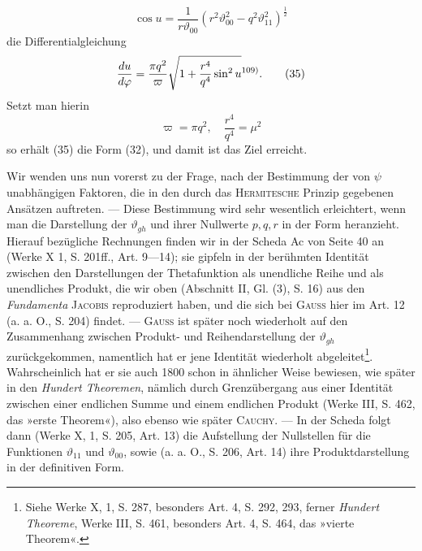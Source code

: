 \[
\cos u=\frac1{r\vartheta_{00}}(r^2\vartheta_{00}^2-q^2\vartheta_{11}^2)^{\frac12}
\]
\noindent die Differentialgleichung
\begingroup\makeatletter\tagsleft@true\let\veqno\leqno\makeatother
\begin{equation*}
\frac{du}{d\varphi}=\frac{\pi q^2}{\varpi}\sqrt{1+\frac{r^4}{q^4}\sin^2u}\text{\textsuperscript{109)}}.\tag{35}
\end{equation*}
\endgroup
\setcounter{footnote}{109}
\clearpage{}
\noindent Setzt man hierin
\begingroup\makeatletter\tagsleft@true\let\veqno\leqno\makeatother
\begin{equation*}
\varpi=\pi q^2,\quad\frac{r^4}{q^4}=\mu^2\tag{36}
\end{equation*}
\endgroup
\noindent so erhält (35) die Form (32), und damit ist das Ziel erreicht.

Wir wenden uns nun vorerst zu der Frage, nach der Bestimmung der von
\(\psi\) unabhängigen Faktoren, die in den durch das \textsc{Hermitesche} Prinzip gegebenen
Ansätzen auftreten. — Diese Bestimmung wird sehr wesentlich erleichtert,
wenn man die Darstellung der \(\vartheta_{gh}\) und ihrer Nullwerte \(p,q,r\) in der Form
 heranzieht. Hierauf bezügliche Rechnungen finden
wir in der Scheda Ac von Seite 40 an (Werke X 1, S. 201ff., Art. 9—14);
sie gipfeln in der berühmten Identität zwischen den Darstellungen der Thetafunktion als unendliche Reihe und als unendliches Produkt, die wir oben
(Abschnitt II, Gl. (3), S. 16) aus den \textit{Fundamenta} \textsc{Jacobis} reproduziert haben,
und die sich bei \textsc{Gauss} hier im Art. 12 (a. a. O., S. 204) findet. — \textsc{Gauss} ist
später noch wiederholt auf den Zusammenhang zwischen Produkt- und Reihendarstellung der \(\vartheta_{gh}\) zurückgekommen, namentlich hat er jene Identität wiederholt abgeleitet\footnote{Siehe Werke X, 1, S. 287, besonders Art. 4, S. 292, 293, ferner \textit{Hundert Theoreme}, Werke III, S. 461, besonders Art. 4, S. 464, das »vierte Theorem«.}. Wahrscheinlich hat er sie auch 1800 schon in ähnlicher
Weise bewiesen, wie später in den \textit{Hundert Theoremen}, nämlich durch Grenzübergang aus einer Identität zwischen einer endlichen Summe und einem endlichen Produkt (Werke III, S. 462, das »erste Theorem«), also ebenso wie
später \textsc{Cauchy}. — In der Scheda folgt dann (Werke X, 1, S. 205, Art. 13)
die Aufstellung der Nullstellen für die Funktionen \(\vartheta_{11}\) und \(\vartheta_{00}\), sowie (a. a. O.,
S. 206, Art. 14) ihre Produktdarstellung in der definitiven Form.

